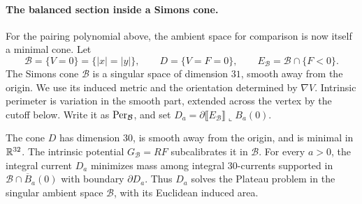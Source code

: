 \paragraph{The balanced section inside a Simons cone.}
\label{sec:Hopf-intrinsic-extension}

For the pairing polynomial above, the ambient space for comparison
is now itself a minimal cone. Let
\[
 \mathcal B=\{V=0\}=\{|x|=|y|\},\qquad
 D=\{V=F=0\},\qquad E_{\mathcal B}=\mathcal B\cap\{F<0\}.
\]
The Simons cone \(\mathcal B\) is a singular space of dimension
\(31\), smooth away from the origin. We use its induced metric
and the orientation determined by \(\nabla V\).
Intrinsic perimeter is variation in the smooth part, extended across
the vertex by the cutoff below. Write it as \(\operatorname{Per}_{\mathcal B}\), and set
\(D_a=\partial\llbracket E_{\mathcal B}\rrbracket
\mathbin{\llcorner}B_a(0)\).

\begin{theorem}
\label{thm:Hopf-Simons-section}
The cone \(D\) has dimension \(30\), is smooth away from the
origin, and is minimal in \(\mathbb R^{32}\). The intrinsic potential
\(G_{\mathcal B}=RF\) subcalibrates it in \(\mathcal B\).
For every \(a>0\), the integral current \(D_a\) minimizes mass
among integral \(30\)-currents supported in
\(\mathcal B\cap\overline B_a(0)\) with boundary \(\partial D_a\).
Thus \(D_a\) solves the Plateau problem in the singular ambient
space \(\mathcal B\), with its Euclidean induced area.
\end{theorem}

